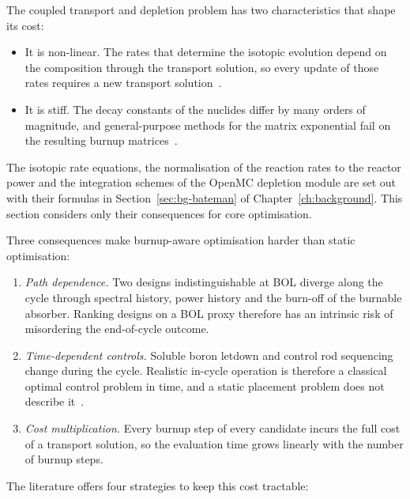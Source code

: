 The coupled transport and depletion problem has two characteristics that
shape its cost:

\begin{itemize}
  \item It is non-linear. The rates that determine the isotopic evolution
        depend on the composition through the transport solution, so
        every update of those rates requires a new transport
        solution~\cite{romano_2021_depletion}.

  \item It is stiff. The decay constants of the nuclides differ by many
        orders of magnitude, and general-purpose methods for the matrix
        exponential fail on the resulting burnup
        matrices~\cite{pusa_2016}.
\end{itemize}

The isotopic rate equations, the normalisation of the reaction rates to
the reactor power and the integration schemes of the OpenMC depletion
module are set out with their formulas in
Section~\ref{sec:bg-bateman} of Chapter~\ref{ch:background}. This
section considers only their consequences for core optimisation.

Three consequences make burnup-aware optimisation harder than static
optimisation:

\begin{enumerate}
  \item \emph{Path dependence.} Two designs indistinguishable at BOL
        diverge along the cycle through spectral history, power history
        and the burn-off of the burnable absorber. Ranking designs on a
        BOL proxy therefore has an intrinsic risk of misordering the
        end-of-cycle outcome.

  \item \emph{Time-dependent controls.} Soluble boron letdown and
        control rod sequencing change during the cycle. Realistic
        in-cycle operation is therefore a classical optimal control
        problem in time, and a static placement problem does not
        describe it~\cite{downar_1988}.

  \item \emph{Cost multiplication.} Every burnup step of every candidate
        incurs the full cost of a transport solution, so the evaluation
        time grows linearly with the number of burnup steps.
\end{enumerate}

The literature offers four strategies to keep this cost tractable:

